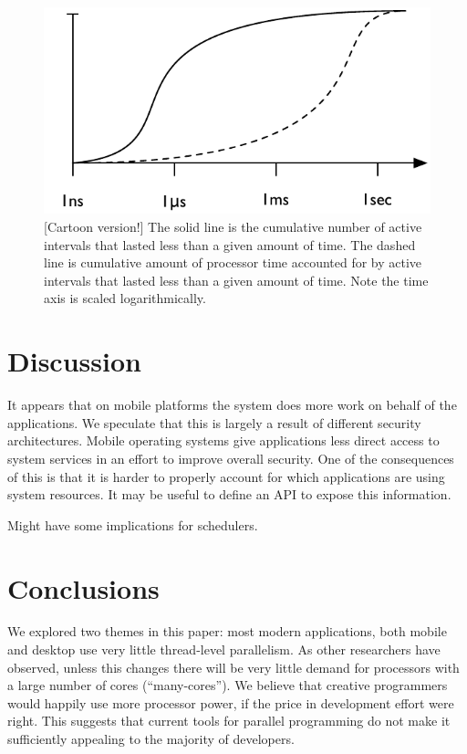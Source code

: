 \documentclass[11pt]{sigplanconf}
\begin{document}
\begin{figure}
\includegraphics[width=\columnwidth]{cartoon_event_handler_data}
\caption{[Cartoon version!] The solid line is the cumulative number of
  active intervals that lasted less than a given amount of time.  The
  dashed line is cumulative amount of processor time accounted for by
  active intervals that lasted less than a given amount of time.  Note the
  time axis is scaled logarithmically.}
\label{figure:event_handler_data}
\end{figure}

\section{Discussion}

It appears that on mobile platforms the system does more work on behalf
of the applications.  We speculate that this is largely a result of
different security architectures.  Mobile operating systems give
applications less direct access to system services in an effort to
improve overall security.  One of the consequences of this is that it is
harder to properly account for which applications are using system
resources.  It may be useful to define an API to expose this
information.

Might have some implications for schedulers.

\section{Conclusions}

We explored two themes in this paper: most modern applications, both
mobile and desktop use very little thread-level parallelism.  As other
researchers have observed, unless this changes there will be very little
demand for processors with a large number of cores (``many-cores'').  We
believe that creative programmers would happily use more processor
power, if the price in development effort were right.  This suggests
that current tools for parallel programming do not make it sufficiently
appealing to the majority of developers.
\end{document}
